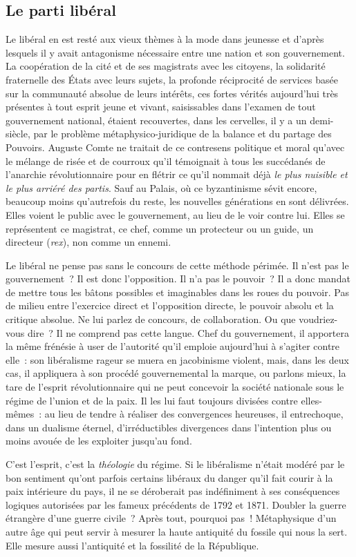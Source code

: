 \documentclass[french,twoside]{book} %
\begin{document}
\subsection[{Le parti libéral}]{Le parti libéral}
\noindent Le libéral en est resté aux vieux thèmes à la mode dans jeunesse et d’après lesquels il y avait antagonisme nécessaire entre une nation et son gouvernement. La coopération de la cité et de ses magistrats avec les citoyens, la solidarité fraternelle des États avec leurs sujets, la profonde réciprocité de services basée sur la communauté absolue de leurs intérêts, ces fortes vérités aujourd’hui très présentes à tout esprit jeune et vivant, saisissables dans l’examen de tout gouvernement national, étaient recouvertes, dans les cervelles, il y a un demi-siècle, par le problème métaphysico-juridique de la balance et du partage des Pouvoirs. Auguste Comte ne traitait de ce contresens politique et moral qu’avec le mélange de risée et de courroux qu’il témoignait à tous les succédanés de l’anarchie révolutionnaire pour en flétrir ce qu’il nommait déjà \emph{le plus nuisible et le plus arriéré des partis}. Sauf au Palais, où ce byzantinisme sévit encore, beaucoup moins qu’autrefois du reste, les nouvelles générations en sont délivrées. Elles voient le public avec le gouvernement, au lieu de le voir contre lui. Elles se représentent ce magistrat, ce chef, comme un protecteur ou un guide, un directeur (\emph{rex}), non comme un ennemi.\par
Le libéral ne pense pas sans le concours de cette méthode périmée. Il n’est pas le gouvernement ? Il est donc l’opposition. Il n’a pas le pouvoir ? Il a donc mandat de mettre tous les bâtons possibles et imaginables dans les roues du pouvoir. Pas de milieu entre l’exercice direct et l’opposition directe, le pouvoir absolu et la critique absolue. Ne lui parlez de concours, de collaboration. Ou que voudriez-vous dire ? Il ne comprend pas cette langue. Chef du gouvernement, il apportera la même frénésie à user de l’autorité qu’il emploie aujourd’hui à s’agiter contre elle : son libéralisme rageur se muera en jacobinisme violent, mais, dans les deux cas, il appliquera à son procédé gouvernemental la marque, ou parlons mieux, la tare de l’esprit révolutionnaire qui ne peut concevoir la société nationale sous le régime de l’union et de la paix. Il les lui faut toujours divisées contre elles-mêmes : au lieu de tendre à réaliser des convergences heureuses, il entrechoque, dans un dualisme éternel, d’irréductibles divergences dans l’intention plus ou moins avouée de les exploiter jusqu’au fond.\par
C’est l’esprit, c’est la \emph{théologie} du régime. Si le libéralisme n’était modéré par le bon sentiment qu’ont parfois certains libéraux du danger qu’il fait courir à la paix intérieure du pays, il ne se déroberait pas indéfiniment à ses conséquences logiques autorisées par les fameux précédents de 1792 et 1871. Doubler la guerre étrangère d’une guerre civile ? Après tout, pourquoi pas ! Métaphysique d’un autre âge qui peut servir à mesurer la haute antiquité du fossile qui nous la sert. Elle mesure aussi l’antiquité et la fossilité de la République.\par
\end{document}
